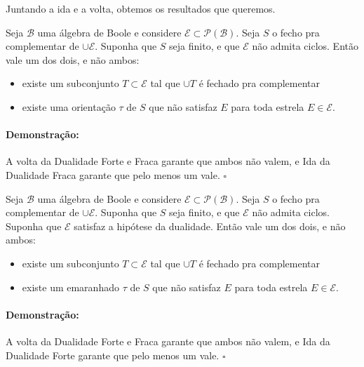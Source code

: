 \documentclass[11pt]{article}
\newcommand{\pulinho}{\vspace{.5cm}}
\theoremstyle{definition}
\theoremstyle{definition}
\newtheorem*{theorem*}{Teorema}
\newenvironment{teorema*}{
\definecolor{shadecolor}{HTML}{f59aa3}
\begin{shaded}
\begin{theorem*}
}
{
\end{theorem*}
\end{shaded}
}
\theoremstyle{definition}
\theoremstyle{definition}
\theoremstyle{definition}
\theoremstyle{definition}
\theoremstyle{definition}
\theoremstyle{definition}
\theoremstyle{definition}
\theoremstyle{definition}
\theoremstyle{definition}
\theoremstyle{definition}
\newenvironment{prova}{\paragraph{Demonstração:}}{\hfill$\square$ 
\pulinho
}
\theoremstyle{definition}
\theoremstyle{definition}
\begin{document}
Juntando a ida e a volta, obtemos os resultados que queremos.

\begin{teorema*}
  Seja $\mathcal{B}$ uma álgebra de Boole e considere $\mathcal{E} \subset \mathcal{P}(\mathcal{B})$. Seja $S$ o fecho pra complementar de $\cup \mathcal{E}$. Suponha que $S$ seja finito, e que $\mathcal{E}$ não admita ciclos. Então vale um dos dois, e não ambos:
  
  \begin{itemize}[label=]
  \item existe um subconjunto $T \subset \mathcal{E}$ tal que $\cup T$ é fechado pra complementar
  \item existe uma orientação $\tau$ de $S$ que não satisfaz $E$ para toda estrela $E \in \mathcal{E}$.
\end{itemize}
\end{teorema*}
\begin{prova}
  A volta da Dualidade Forte e Fraca garante que ambos não valem, e Ida da Dualidade Fraca garante que pelo menos um vale.
\end{prova}

\begin{teorema*}
  Seja $\mathcal{B}$ uma álgebra de Boole e considere $\mathcal{E} \subset \mathcal{P}(\mathcal{B})$. Seja $S$ o fecho pra complementar de $\cup \mathcal{E}$. Suponha que $S$ seja finito, e que $\mathcal{E}$ não admita ciclos. Suponha que $\mathcal{E}$ satisfaz a hipótese da dualidade. Então vale um dos dois, e não ambos:
  
  \begin{itemize}[label=]
  \item existe um subconjunto $T \subset \mathcal{E}$ tal que $\cup T$ é fechado pra complementar
  \item existe um emaranhado $\tau$ de $S$ que não satisfaz $E$ para toda estrela $E \in \mathcal{E}$.
\end{itemize}
\end{teorema*}
\begin{prova}
  A volta da Dualidade Forte e Fraca garante que ambos não valem, e Ida da Dualidade Forte garante que pelo menos um vale.
\end{prova}


\end{document}
